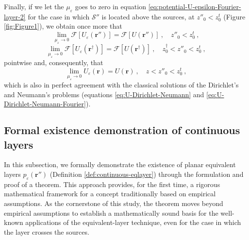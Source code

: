 Finally, if we let the $\mu_{\varepsilon}$ 
goes to zero in equation \ref{eq:potential-U-epsilon-Fourier-layer-2} for the case in which 
$\mathcal{S}''$ is located above the sources, at $z''_{0} < z^{t}_{0}$ (Figure \ref{fig:Figure1}), 
we obtain once more that 
\begin{equation}
	\lim_{\mu_{\varepsilon}\to 0} \mathcal{F} \left[ U_{\varepsilon}(\mathbf{r}'') \right] = 
	\mathcal{F} \left[ U(\mathbf{r}'') \right] \: , \quad z''_{0} < z^{t}_{0} \: ,
	\label{eq:lim-muepsilon-potential-U-epsilon-Fourier-layer}
\end{equation}
\begin{equation}
	\lim_{\mu_{\varepsilon}\to 0} \mathcal{F} \left[ U_{\varepsilon}(\mathbf{r}^{\dagger}) \right] = 
	\mathcal{F} \left[ U(\mathbf{r}^{\dagger}) \right] \: , \quad z^{\dagger}_{0} < z''_{0} < z^{t}_{0} \: ,
	\label{eq:lim-muepsilon-potential-U-epsilon-Fourier-dagger}
\end{equation}
pointwise and, consequently, that
\begin{equation}
	\lim_{\mu_{\varepsilon}\to 0} U_{\varepsilon}(\mathbf{r}) = 
	U(\mathbf{r}) \: , \quad z < z''_{0} < z^{t}_{0} \: ,
	\label{eq:lim-muepsilon-potential-U-epsilon-space}
\end{equation}
which is also in perfect agreement with the classical solutions of the Dirichlet's and Neumann's
problems (equations \ref{eq:U-Dirichlet-Neumann} and \ref{eq:U-Dirichlet-Neumann-Fourier}).

\subsection{Formal existence demonstration of continuous layers}

In this subsection, we formally demonstrate the existence of planar equivalent layers 
$p_{\varepsilon}(\mathbf{r}'')$ (Definition \ref{def:continuous-eqlayer}) 
through the formulation and proof of a theorem. This approach provides, for the first time, a rigorous mathematical 
framework for a concept traditionally based on empirical assumptions.
As the cornerstone of this study, the theorem moves beyond empirical assumptions to establish 
a mathematically sound basis for the well-known applications of the equivalent-layer technique, 
even for the case in which the layer crosses the sources.

